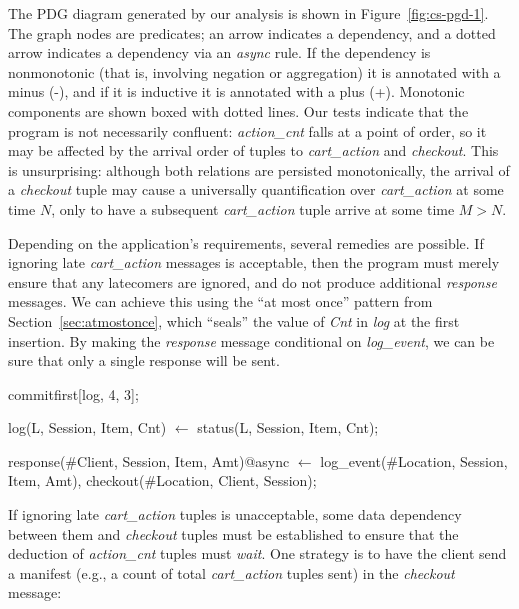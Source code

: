 The PDG diagram generated by our analysis is shown in Figure~\ref{fig:cs-pgd-1}.
The graph nodes are predicates; an arrow indicates a dependency, and a dotted arrow
indicates a dependency via an {\em async} rule.  If the dependency is nonmonotonic
(that is, involving negation or aggregation) it is annotated with a minus (-), and if it is
inductive it is annotated with a plus (+).  Monotonic components are shown boxed with
dotted lines.
Our tests indicate that the program is not necessarily confluent: 
{\em action\_cnt} falls at a point of order, so it may
be affected by the arrival order of tuples to {\em cart\_action} and
{\em checkout}.  This is unsurprising: although both relations are persisted monotonically,
the arrival of a {\em checkout} tuple may cause a universally quantification over {\em cart\_action}
at some time $N$, only to have a subsequent {\em cart\_action} tuple arrive at some time $M > N$.

Depending on the application's requirements, several remedies are possible. If ignoring
late {\em cart\_action} messages is acceptable, then the program must merely ensure
that any latecomers are ignored, and 
do not produce additional {\em response} messages.
We can achieve this using the ``at most once'' pattern from Section~\ref{sec:atmostonce}, which ``seals'' the value
of {\em Cnt} in {\em log} at the first insertion. By making the {\em response} message conditional on \emph{log\_event}, we can be sure that only a single response will be sent.

\begin{Dedalus}
commitfirst[log, 4, 3];

log(L, Session, Item, Cnt) \(\leftarrow\) 
    status(L, Session, Item, Cnt);

response(#Client, Session, Item, Amt)@async \(\leftarrow\)
    log_event(#Location, Session, Item, Amt),
    checkout(#Location, Client, Session);
\end{Dedalus}

If ignoring late {\em cart\_action} tuples is unacceptable,
some data dependency between them and {\em checkout} tuples must be established
to ensure that the deduction of {\em action\_cnt} tuples must {\em wait}.  
One strategy 
is to have the client send a manifest (e.g., a count of total {\em cart\_action} tuples
sent) in the {\em checkout} message:

